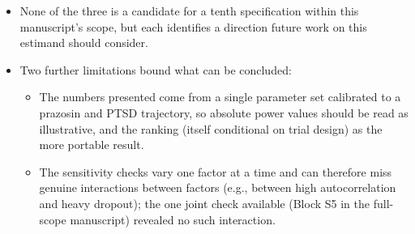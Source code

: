 \documentclass[
  11pt,
]{article}
\providecommand{\tightlist}{%
  \setlength{\itemsep}{0pt}\setlength{\parskip}{0pt}}
\begin{document}
\begin{itemize}
  \begin{itemize}
  \tightlist
  \item
    Tang and Landes\textsuperscript{}: formula-based \(t\)-tests
    correcting a single-subject paired-difference test's SE and
    degrees of freedom for an estimated first-order serial
    correlation -- the natural refinement \texttt{G5} lacks (\texttt{G5} discards
    within-patient correlation entirely). Their tests have no
    biomarker-moderation term, and would need a \texttt{diff\ \textasciitilde{}\ bm} extension
    with a serial-correlation-aware variance to enter this
    comparison.
  \item
    Schmid and Yang\textsuperscript{}: a Bayesian hierarchical
    alternative to the frequentist mixed-model/sandwich-estimator
    family spanning \texttt{G1}-\texttt{G9}, with partial pooling of individual-
    level treatment-effect, trend, and autocorrelation parameters
    across patients; they note carryover is tractable only in
    aggregated, multi-individual analyses like this one, but a
    biomarker-moderation extension of their model is a separate
    undertaking.
  \item
    Daza\textsuperscript{}: frames N-of-1 inference as a
    counterfactual, time-varying-treatment problem, estimated via
    g-computation or inverse-probability weighting -- a structurally
    different paradigm from \texttt{G1}-\texttt{G9}'s explicit exponential-decay or
    lag covariates, treating carryover as confounding to be
    controlled rather than a predictor to be modeled.
  \end{itemize}
\item
  None of the three is a candidate for a tenth specification within
  this manuscript's scope, but each identifies a direction future
  work on this estimand should consider.
\item
  Two further limitations bound what can be concluded:

  \begin{itemize}
  \tightlist
  \item
    The numbers presented come from a single parameter set calibrated
    to a prazosin and PTSD trajectory, so absolute power values
    should be read as illustrative, and the ranking (itself
    conditional on trial design) as the more portable result.
  \item
    The sensitivity checks vary one factor at a time and can
    therefore miss genuine interactions between factors (e.g.,
    between high autocorrelation and heavy dropout); the one joint
    check available (Block S5 in the full-scope manuscript) revealed
    no such interaction.
  \end{itemize}
\end{itemize}
\end{document}
